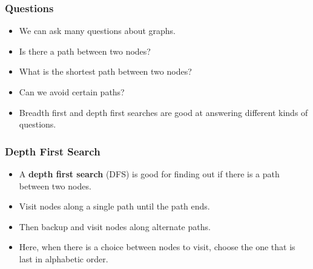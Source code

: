 \documentclass{beamer}
\begin{document}

\begin{frame}
\frametitle{Questions}

\begin{itemize}
\item We can ask many questions about graphs.
\item Is there a path between two nodes?
\item What is the shortest path between two nodes?
\item Can we avoid certain paths?
\item Breadth first and depth first searches are good at answering different kinds of questions.

\end{itemize}
\end{frame}
\begin{frame}
\frametitle{Depth First Search}
\begin{itemize}
\item A \textbf{depth first search} (DFS) is good for finding out if there is a path between two nodes.
\item Visit nodes along a single path until the path ends.
\item Then backup and visit nodes along alternate paths.
\item Here, when there is a choice between nodes to visit, choose the one that is last in alphabetic order.
\end{itemize}
\end{frame}
\end{document}
